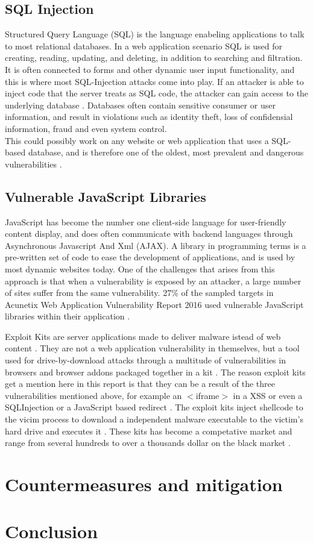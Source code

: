 \subsection{SQL Injection}
Structured Query Language (SQL) is the language enabeling applications to talk to most relational databases. In a web application scenario SQL is used for creating, reading, updating, and deleting, in addition to searching and filtration. It is often connected to forms and other dynamic user input functionality, and this is where most SQL-Injection attacks come into play. If an attacker is able to inject code that the server treats as SQL code, the attacker can gain access to the underlying database \cite{Bisson2005}. Databases often contain sensitive consumer or user information, and result in violations such as identity theft, loss of confidensial information, fraud and even system control.
\\ This could possibly work on any website or web application that uses a SQL-based database, and is therefore one of the oldest, most prevalent and dangerous vulnerabilities \cite{Acunetix2016}.
\subsection{Vulnerable JavaScript Libraries}
JavaScript has become the number one client-side language for user-friendly content display, and does often communicate with backend languages through Asynchronous Javascript And Xml (AJAX). A library in programming terms is a pre-written set of code to ease the development of applications, and is used by most dynamic websites today. One of the challenges that arises from this approach is that when a vulnerability is exposed by an attacker, a large number of sites suffer from the same vulnerability.
27\% of the sampled targets in Acunetix Web Application Vulnerability Report 2016 used vulnerable JavaScript libraries within their application \cite{Acunetix2016}. 



Exploit Kits are server applications made to deliver malware istead of web content \cite{Preuss2011}. They are not a web application vulnerability in themselves, but a tool used for drive-by-download attacks through a multitude of vulnerabilities in browsers and browser addons packaged together in a kit \cite{Kotov2013}. The reason exploit kits get a mention here in this report is that they can be a result of the three vulnerabilities mentioned above, for example an $<$iframe$>$ in a XSS or even a SQLInjection or a JavaScript based redirect \cite{Preuss2011}.
The exploit kits inject shellcode to the vicim process to download a independent malware executable to the victim's hard drive and executes it \cite{Preuss2011}.
These kits has become a competative market and range from several hundreds to over a thousands dollar on the black market \cite{Preuss2011}.
\section{Countermeasures and mitigation}
\section{Conclusion}



